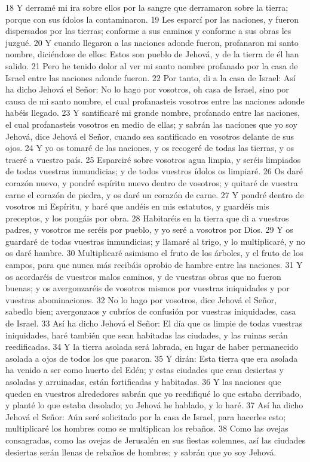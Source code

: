 18 Y derramé mi ira sobre ellos por la sangre que derramaron sobre la tierra; porque con sus ídolos la contaminaron.
19 Les esparcí por las naciones, y fueron dispersados por las tierras; conforme a sus caminos y conforme a sus obras les juzgué.
20 Y cuando llegaron a las naciones adonde fueron, profanaron mi santo nombre, diciéndose de ellos: Estos son pueblo de Jehová, y de la tierra de él han salido.
21 Pero he tenido dolor al ver mi santo nombre profanado por la casa de Israel entre las naciones adonde fueron.
22 Por tanto, di a la casa de Israel: Así ha dicho Jehová el Señor: No lo hago por vosotros, oh casa de Israel, sino por causa de mi santo nombre, el cual profanasteis vosotros entre las naciones adonde habéis llegado.
23 Y santificaré mi grande nombre, profanado entre las naciones, el cual profanasteis vosotros en medio de ellas; y sabrán las naciones que yo soy Jehová, dice Jehová el Señor, cuando sea santificado en vosotros delante de sus ojos.
24 Y yo os tomaré de las naciones, y os recogeré de todas las tierras, y os traeré a vuestro país.
25 Esparciré sobre vosotros agua limpia, y seréis limpiados de todas vuestras inmundicias; y de todos vuestros ídolos os limpiaré.
26 Os daré corazón nuevo, y pondré espíritu nuevo dentro de vosotros; y quitaré de vuestra carne el corazón de piedra, y os daré un corazón de carne.
27 Y pondré dentro de vosotros mi Espíritu, y haré que andéis en mis estatutos, y guardéis mis preceptos, y los pongáis por obra.
28 Habitaréis en la tierra que di a vuestros padres, y vosotros me seréis por pueblo, y yo seré a vosotros por Dios. 
29 Y os guardaré de todas vuestras inmundicias; y llamaré al trigo, y lo multiplicaré, y no os daré hambre.
30 Multiplicaré asimismo el fruto de los árboles, y el fruto de los campos, para que nunca más recibáis oprobio de hambre entre las naciones.
31 Y os acordaréis de vuestros malos caminos, y de vuestras obras que no fueron buenas; y os avergonzaréis de vosotros mismos por vuestras iniquidades y por vuestras abominaciones.
32 No lo hago por vosotros, dice Jehová el Señor, sabedlo bien; avergonzaos y cubríos de confusión por vuestras iniquidades, casa de Israel.
33 Así ha dicho Jehová el Señor: El día que os limpie de todas vuestras iniquidades, haré también que sean habitadas las ciudades, y las ruinas serán reedificadas.
34 Y la tierra asolada será labrada, en lugar de haber permanecido asolada a ojos de todos los que pasaron.
35 Y dirán: Esta tierra que era asolada ha venido a ser como huerto del Edén; y estas ciudades que eran desiertas y asoladas y arruinadas, están fortificadas y habitadas.
36 Y las naciones que queden en vuestros alrededores sabrán que yo reedifiqué lo que estaba derribado, y planté lo que estaba desolado; yo Jehová he hablado, y lo haré.
37 Así ha dicho Jehová el Señor: Aún seré solicitado por la casa de Israel, para hacerles esto; multiplicaré los hombres como se multiplican los rebaños.
38 Como las ovejas consagradas, como las ovejas de Jerusalén en sus fiestas solemnes, así las ciudades desiertas serán llenas de rebaños de hombres; y sabrán que yo soy Jehová.

